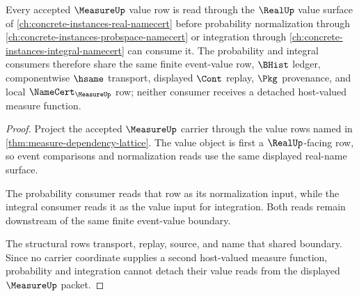 \begin{theorem}
\label{thm:measure-probability-integral-value-route}
Every accepted $\MeasureUp$ value row is read through the $\RealUp$ value surface of \autoref{ch:concrete-instances-real-namecert} before probability normalization through \autoref{ch:concrete-instances-probspace-namecert} or integration through \autoref{ch:concrete-instances-integral-namecert} can consume it. The probability and integral consumers therefore share the same finite event-value row, $\BHist$ ledger, componentwise $\hsame$ transport, displayed $\Cont$ replay, $\Pkg$ provenance, and local $\NameCert_{\MeasureUp}$ row; neither consumer receives a detached host-valued measure function.
\end{theorem}
\begin{proof}
Project the accepted $\MeasureUp$ carrier through the value rows named in \autoref{thm:measure-dependency-lattice}. The value object is first a $\RealUp$-facing row, so event comparisons and normalization reads use the same displayed real-name surface.

The probability consumer reads that row as its normalization input, while the integral consumer reads it as the value input for integration. Both reads remain downstream of the same finite event-value boundary.

The structural rows transport, replay, source, and name that shared boundary. Since no carrier coordinate supplies a second host-valued measure function, probability and integration cannot detach their value reads from the displayed $\MeasureUp$ packet.
\end{proof}
